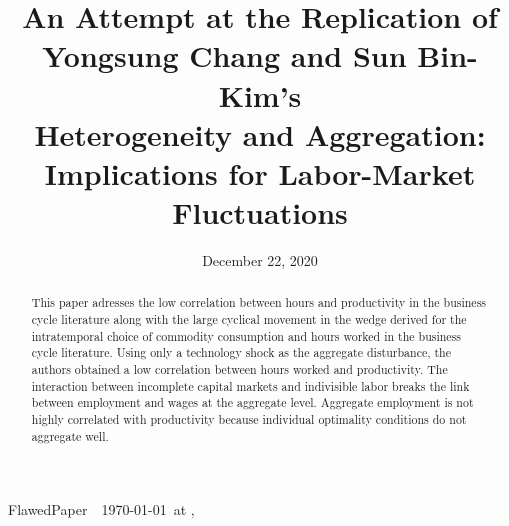 \documentclass[titlepage,letterpaper]{\econtex}
\providecommand{\texname}{FlawedPaper}
\providecommand{\versn}{}
\begin{document}


\hfill{\tiny \texname~\versn~\today~{at} \DTMcurrenttime, ~~}

\title{An Attempt at the Replication of \\ Yongsung Chang and Sun Bin-Kim's \\ Heterogeneity and Aggregation: \\ Implications for Labor-Market Fluctuations}

\newlength\TableWidth


\date{December 22, 2020}
\maketitle




\hypertarget{Abstract}{}
\begin{abstract}
This paper adresses the low correlation between hours and productivity in the business cycle literature along with the large cyclical movement in the wedge derived for the intratemporal choice of commodity consumption and hours worked in the business cycle literature. Using only a technology shock as the aggregate disturbance, the authors obtained a low correlation between hours worked and productivity. The interaction between incomplete capital markets and indivisible labor breaks the link between employment and wages at the aggregate level. Aggregate employment is not highly correlated with productivity because individual optimality conditions do not aggregate well.
\end{abstract}
\end{document}
